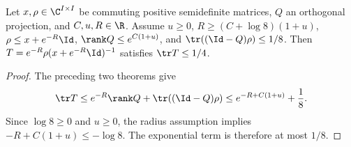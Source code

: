 \begin{theorem}
\label{thm:patch_regulator_quarter}
\leanok
Let $x,\rho\in\C^{I\times I}$ be commuting positive semidefinite matrices,
$Q$ an orthogonal projection, and $C,u,R\in\R$. Assume $u\ge0$,
$R\ge(C+\log8)(1+u)$, $\rho\le x+e^{-R}\Id$,
$\rank Q\le e^{C(1+u)}$, and $\tr((\Id-Q)\rho)\le1/8$.
Then $T=e^{-R}\rho(x+e^{-R}\Id)^{-1}$ satisfies $\tr T\le1/4$.
\end{theorem}
\begin{proof}
\leanok
{}
The preceding two theorems give
\begin{align}
 \tr T\le e^{-R}\rank Q+\tr((\Id-Q)\rho)
         \le e^{-R+C(1+u)}+\frac18.
\end{align}
Since $\log8\ge0$ and $u\ge0$, the radius assumption implies
$-R+C(1+u)\le-\log8$. The exponential term is therefore at most $1/8$.
\end{proof}

